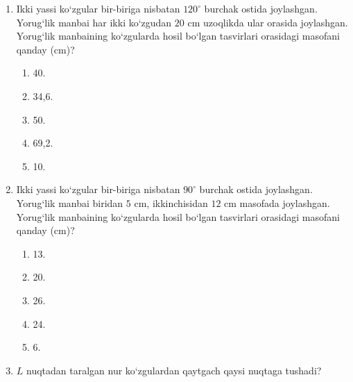 \begin{enumerate}
\begin{enumerate}[label=\Alph*)]
\item 12.
\item 17.
\item 20,8.
\item 24.
\item TJY.
\end{enumerate}

\item Ikki yassi ko‘zgular bir-biriga nisbatan $120^\circ$ burchak ostida joylashgan. Yorug‘lik manbai har ikki ko‘zgudan $20$ cm uzoqlikda ular orasida joylashgan. Yorug‘lik manbaining ko‘zgularda hosil bo‘lgan tasvirlari orasidagi masofani qanday (cm)?
\begin{enumerate}[label=\Alph*)]
\item 40.
\item 34,6.
\item 50.
\item 69,2.
\item 10.
\end{enumerate}

\item Ikki yassi ko‘zgular bir-biriga nisbatan $90^\circ$ burchak ostida joylashgan. Yorug‘lik manbai biridan $5$ cm, ikkinchisidan $12$ cm masofada joylashgan. Yorug‘lik manbaining ko‘zgularda hosil bo‘lgan tasvirlari orasidagi masofani qanday (cm)?
\begin{enumerate}[label=\Alph*)]
\item 13.
\item 20.
\item 26.
\item 24.
\item 6.
\end{enumerate}

\item $L$ nuqtadan taralgan nur ko‘zgulardan qaytgach qaysi nuqtaga tushadi?

\end{enumerate}

